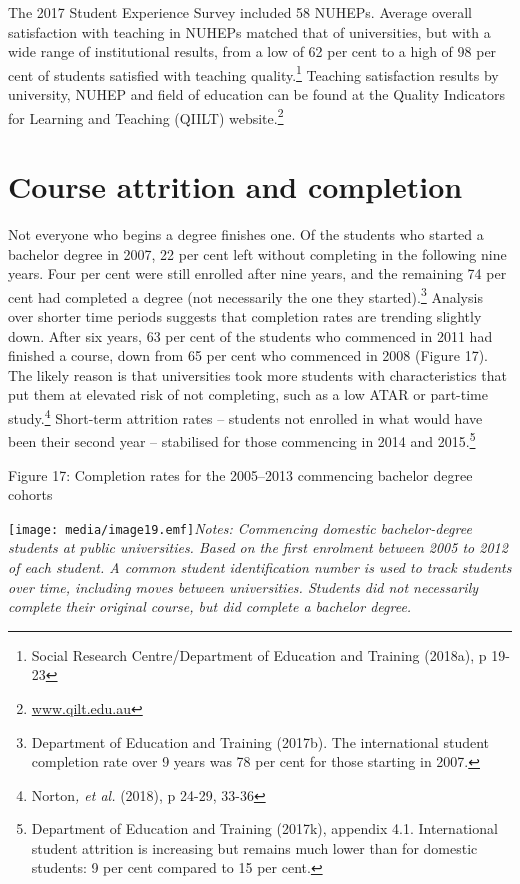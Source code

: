 \documentclass[]{book}
\begin{document}
The 2017 Student Experience Survey included 58 NUHEPs. Average overall satisfaction with teaching in NUHEPs matched that of universities, but with a wide range of institutional results, from a low of 62 per cent to a high of 98 per cent of students satisfied with teaching quality.\footnote{Social Research Centre/Department of Education and Training (2018a), p 19-23} Teaching satisfaction results by university, NUHEP and field of education can be found at the Quality Indicators for Learning and Teaching (QIILT) website.\footnote{\href{http://www.qilt.edu.au}{www.qilt.edu.au}}

\hypertarget{course-attrition-and-completion}{%
\section{Course attrition and completion }\label{course-attrition-and-completion}}

Not everyone who begins a degree finishes one. Of the students who started a bachelor degree in 2007, 22 per cent left without completing in the following nine years. Four per cent were still enrolled after nine years, and the remaining 74 per cent had completed a degree (not necessarily the one they started).\footnote{Department of Education and Training (2017b). The international student completion rate over 9 years was 78 per cent for those starting in 2007.} Analysis over shorter time periods suggests that completion rates are trending slightly down. After six years, 63 per cent of the students who commenced in 2011 had finished a course, down from 65 per cent who commenced in 2008 (Figure 17). The likely reason is that universities took more students with characteristics that put them at elevated risk of not completing, such as a low ATAR or part-time study.\footnote{Norton\emph{, et al.} (2018), p 24-29, 33-36} Short-term attrition rates -- students not enrolled in what would have been their second year -- stabilised for those commencing in 2014 and 2015.\footnote{Department of Education and Training (2017k), appendix 4.1. International student attrition is increasing but remains much lower than for domestic students: 9 per cent compared to 15 per cent.}

\protect\hypertarget{_Ref519596476}{}{}Figure 17: Completion rates for the 2005--2013 commencing bachelor degree cohorts

\texttt{[image: media/image19.emf]}\emph{Notes: Commencing domestic bachelor-degree students at public universities. Based on the first enrolment between 2005 to 2012 of each student. A common student identification number is used to track students over time, including moves between universities. Students did not necessarily complete their original course, but did complete a bachelor degree. }
\end{document}
